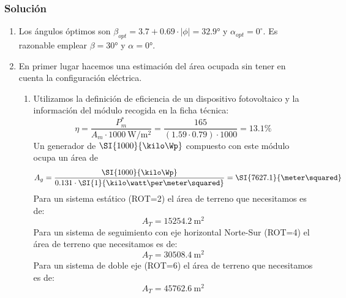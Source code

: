 \subsubsection{Solución}
\begin{enumerate}
\item Los ángulos óptimos son $\beta_{opt}=3.7+0.69\cdot\left|\phi\right|=\ang{32.9}$
y $\alpha_{opt}=0^{\circ}$. Es razonable emplear $\beta=\ang{30}$
y $\alpha=\ang{0}$.
\item En primer lugar hacemos una estimación del área ocupada sin tener
en cuenta la configuración eléctrica.

\begin{enumerate}
\item Utilizamos la definición de eficiencia de un dispositivo fotovoltaico
y la información del módulo recogida en la ficha técnica:\[
\eta=\frac{P_{m}^{*}}{A_{m}\cdot\SI{1000}{\watt\per\meter\squared}}=\frac{165}{(1.59\cdot0.79)\cdot1000}=13.1\%\]
Un generador de $\SI{1000}{\kilo\Wp}$ compuesto con este módulo
ocupa un área de \[
A_{g}=\frac{\SI{1000}{\kilo\Wp}}{0.131\cdot\SI{1}{\kilo\watt\per\meter\squared}}=\SI{7627.1}{\meter\squared}\]
Para un sistema estático (ROT=2) el área de terreno que necesitamos
es de: \[
A_{T}=\SI{15254.2}{\meter\squared}\]
Para un sistema de seguimiento con eje horizontal Norte-Sur (ROT=4)
el área de terreno que necesitamos es de: \[
A_{T}=\SI{30508.4}{\meter\squared}\]
Para un sistema de doble eje (ROT=6) el área de terreno que necesitamos
es de: \[
A_{T}=\SI{45762.6}{\meter\squared}\]


\end{enumerate}
\end{enumerate}
